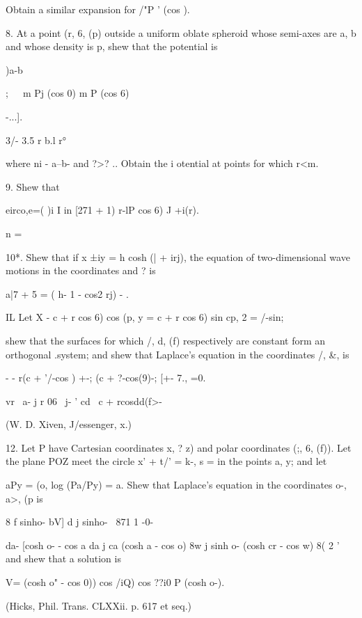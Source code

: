 Obtain a similar expansion for /"P ' (cos ). 

8. At a point (r, 6, (p) outside a uniform oblate spheroid whose
semi-axes are a, b and whose density is p, shew that the potential is

)a-b

;\ \ \ m Pj (cos 0) m P (cos 6)

-...].

3/- 3.5 r b.l r°

where ni - a--b- and ?>? .. Obtain the i otential at points for which
r<m.


%
%

9. Shew that

eirco,e=( )i I in [271 + 1) r-lP cos 6) J +i(r).

n =


10*. Shew that if x ±iy = h cosh (| + irj), the equation of
two-dimensional wave motions in the coordinates and ? is

a|7 + 5 = ( h- 1 - cos2 rj) - . 

IL Let X - c + r cos 6) cos (p, y = c + r cos 6) sin cp, 2 = /-sin;

shew that the surfaces for which /, d, (f) respectively are constant
form an orthogonal .system; and shew that Laplace's equation in the
coordinates /, \&, is

- - r(c + '/-cos ) +-; (c + ?-cos(9)-; [+- 7., =0.

vr \ a- j r 06 \ j- ' cd \ c + rcosdd(f>-

(W. D. Xiven, J/essenger, x.)

12. Let P have Cartesian coordinates x, ? z) and polar coordinates
(;, 6, (f)). Let the plane POZ meet the circle x' + t/' = k-, s = in
the points a, y; and let

aPy = (o, log (Pa/Py) = a. Shew that Laplace's equation in the
coordinates o-, a>, (p is

8 f sinho- bV] d j sinho- \ 871 1 -0-

da- [cosh o- - cos a da j ca (cosh a - cos o) 8w j sinh o- (cosh cr -
cos w) 8( 2 ' and shew that a solution is

V= (cosh o" - cos 0)) cos /iQ) cos ??i0 P (cosh o-).

(Hicks, Phil. Trans. CLXXii. p. 617 et seq.)

